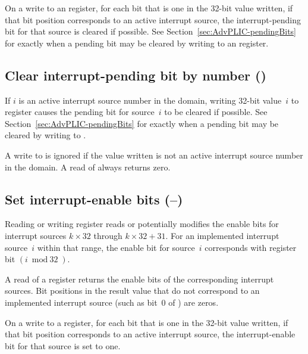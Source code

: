On a write to an  register, for each bit that is one in
the \mbox{32-bit} value written, if that bit position corresponds to an
active interrupt source, the interrupt-pending bit for that source is
cleared if possible.
See Section~\ref{sec:AdvPLIC-pendingBits} for exactly when a pending
bit may be cleared by writing to an  register.

\subsection{Clear interrupt-pending bit by number ()}

If $i$ is an active interrupt source number in the domain, writing
\mbox{32-bit} value~$i$ to register  causes the pending bit
for source~$i$ to be cleared if possible.
See Section~\ref{sec:AdvPLIC-pendingBits} for exactly when a pending
bit may be cleared by writing to .

A write to  is ignored if the value written is not an
active interrupt source number in the domain.
A read of  always returns zero.

\subsection{%
Set interrupt-enable bits (--)%
}

Reading or writing register  reads or potentially
modifies the enable bits for interrupt sources $k\times\mbox{32}$
through ${k\times\mbox{32}+\mbox{31}}$.
For an implemented interrupt source~$i$ within that range, the enable
bit for source~$i$ corresponds with register bit ${(i\bmod\mbox{32})}$.

A read of a  register returns the enable bits of the
corresponding interrupt sources.
Bit positions in the result value that do not correspond to an
implemented interrupt source (such as bit~0 of ) are
zeros.

On a write to a  register, for each bit that is one in the
\mbox{32-bit} value written, if that bit position corresponds to an
active interrupt source, the interrupt-enable bit for that source is
set to one.

